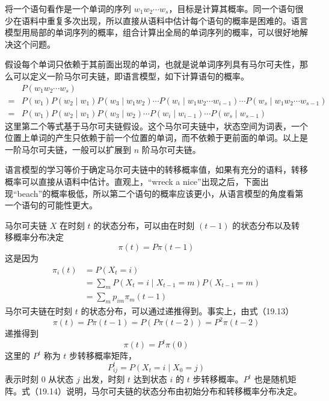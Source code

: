 \documentclass[UTF8,12pt,a4paper,fontset=fandol]{ctexart}
\begin{document}
将一个语句看作是一个单词的序列 $w_1w_2\cdots w_s$，目标是计算其概率。同一个语句很少在语料中重复多次出现，所以直接从语料中估计每个语句的概率是困难的。语言模型用局部的单词序列的概率，组合计算出全局的单词序列的概率，可以很好地解决这个问题。

假设每个单词只依赖于其前面出现的单词，也就是说单词序列具有马尔可夫性，那么可以定义一阶马尔可夫链，即语言模型，如下计算语句的概率。
\[
\begin{aligned}
&P(w_1w_2\cdots w_s)\\
={}&P(w_1)P(w_2\mid w_1)P(w_3\mid w_1w_2)\cdots P(w_i\mid w_1w_2\cdots w_{i-1})\cdots P(w_s\mid w_1w_2\cdots w_{s-1})\\
={}&P(w_1)P(w_2\mid w_1)P(w_3\mid w_2)\cdots P(w_i\mid w_{i-1})\cdots P(w_s\mid w_{s-1})
\end{aligned}
\]
这里第二个等式基于马尔可夫链假设。这个马尔可夫链中，状态空间为词表，一个位置上单词的产生只依赖于前一个位置的单词，而不依赖于更前面的单词。以上是一阶马尔可夫链，一般可以扩展到 $n$ 阶马尔可夫链。

语言模型的学习等价于确定马尔可夫链中的转移概率值，如果有充分的语料，转移概率可以直接从语料中估计。直观上，“wreck a nice”出现之后，下面出现“beach”的概率极低，所以第二个语句的概率应该更小，从语言模型的角度看第一个语句的可能性更大。

马尔可夫链 $X$ 在时刻 $t$ 的状态分布，可以由在时刻 $(t-1)$ 的状态分布以及转移概率分布决定
\begin{equation}
\pi(t)=P\pi(t-1)
\tag{19.13}
\end{equation}
这是因为
\[
\begin{aligned}
\pi_i(t)&=P(X_t=i)\\
&=\sum_m P(X_t=i\mid X_{t-1}=m)P(X_{t-1}=m)\\
&=\sum_m p_{im}\pi_m(t-1)
\end{aligned}
\]
马尔可夫链在时刻 $t$ 的状态分布，可以通过递推得到。事实上，由式（19.13）
\[
\pi(t)=P\pi(t-1)=P(P\pi(t-2))=P^2\pi(t-2)
\]
递推得到
\begin{equation}
\pi(t)=P^t\pi(0)
\tag{19.14}
\end{equation}
这里的 $P^t$ 称为 $t$ 步转移概率矩阵，
\[
P_{ij}^t=P(X_t=i\mid X_0=j)
\]
表示时刻 0 从状态 $j$ 出发，时刻 $t$ 达到状态 $i$ 的 $t$ 步转移概率。$P^t$ 也是随机矩阵。式（19.14）说明，马尔可夫链的状态分布由初始分布和转移概率分布决定。
\end{document}
